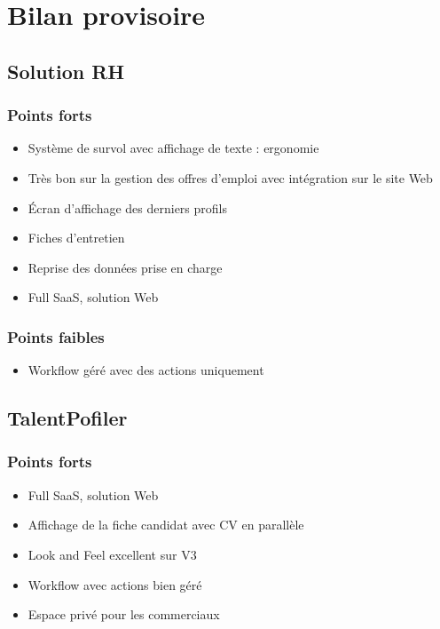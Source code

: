 \documentclass[12pt,twoside]{scrreprt}
\begin{document}
\chapter{Bilan provisoire}



\section{Solution RH}

\subsection{Points forts}
\begin{itemize}
	\item Système de survol avec affichage de texte : ergonomie
	\item Très bon sur la gestion des offres d'emploi avec intégration sur le site Web
	\item Écran d'affichage des derniers profils
	\item Fiches d'entretien
	\item Reprise des données prise en charge
	\item Full SaaS, solution Web
\end{itemize}
\subsection{Points faibles}
\begin{itemize}
	\item Workflow géré avec des actions uniquement
\end{itemize}


\section{TalentPofiler}

\subsection{Points forts}
\begin{itemize}
	\item Full SaaS, solution Web
	\item Affichage de la fiche candidat avec CV en parallèle
	\item Look and Feel excellent sur V3
	\item Workflow avec actions bien géré
	\item Espace privé pour les commerciaux
\end{itemize}
\end{document}
